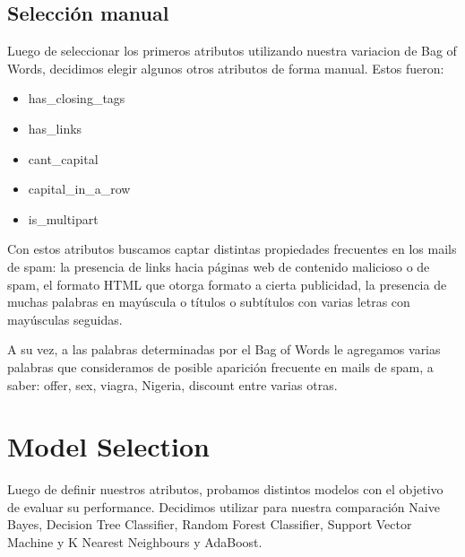 \documentclass[10pt,a4paper]{article}
\begin{document}
\subsection{Selección manual}

Luego de seleccionar los primeros atributos utilizando nuestra variacion de Bag of Words, decidimos elegir algunos otros atributos de forma manual. Estos fueron:

\begin{itemize}
	\item has\_closing\_tags
	\item has\_links
	\item cant\_capital
	\item capital\_in\_a\_row
	\item is\_multipart
\end{itemize}

Con estos atributos buscamos captar distintas propiedades frecuentes en los mails de spam: la presencia de links hacia páginas web de contenido malicioso o de spam, el formato HTML que otorga formato a cierta publicidad, la presencia de muchas palabras en mayúscula o títulos o subtítulos con varias letras con mayúsculas seguidas.

A su vez, a las palabras determinadas por el Bag of Words le agregamos varias palabras que consideramos de posible aparición frecuente en mails de spam, a saber: offer, sex, viagra, Nigeria, discount entre varias otras.

\section{Model Selection}

Luego de definir nuestros atributos, probamos distintos modelos con el objetivo de evaluar su performance. Decidimos utilizar para nuestra comparación Naive Bayes, Decision Tree Classifier, Random Forest Classifier, Support Vector Machine y K Nearest Neighbours y AdaBoost. 

\end{document}
